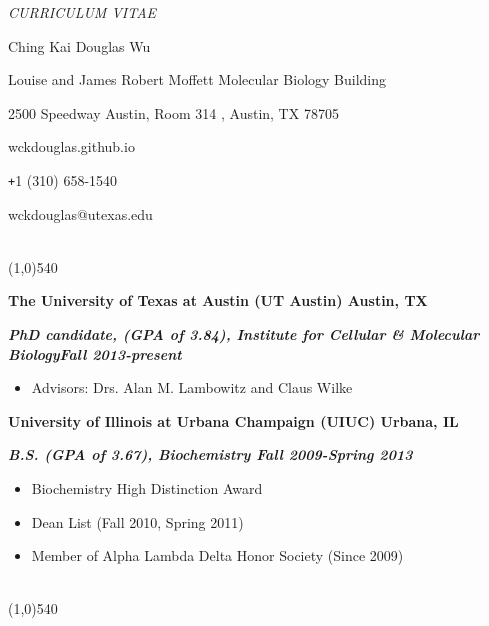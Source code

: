 \documentclass[dvips,11pt]{article}
\begin{document}
\centerline{\it \small CURRICULUM VITAE}
\vspace{2mm}
\centerline{\Large Ching Kai Douglas Wu}
\centerline{ Louise and James Robert Moffett Molecular Biology Building}
\centerline{2500 Speedway Austin, Room 314 , Austin, TX 78705}
\centerline{wckdouglas.github.io}
\centerline{\texttt{+}1 (310) 658-1540}
\centerline{wckdouglas@utexas.edu}
\vspace{.5mm}

 \vspace{-2.5mm}
\\\noindent \line(1,0){540}\\
\noindent \centerline{\bf The University of Texas at Austin (UT Austin) \hfill Austin, TX}
\noindent \centerline{\textit{\textbf{PhD candidate, (GPA of 3.84), Institute for Cellular \& Molecular Biology\hfill Fall 2013-present}}}
\vspace{-6mm}
\begin{spacing}{0.1}
\begin{itemize} \parskip 0pt \parsep 0pt
	\setlength{\itemsep}{1pt}
	\item Advisors: Drs. Alan M. Lambowitz and Claus Wilke
	\end{itemize}
\end{spacing}
\vspace{4mm}
\noindent \centerline{\bf University of Illinois at Urbana Champaign (UIUC) \hfill Urbana, IL}
\noindent \centerline{{\textit{\textbf{B.S. (GPA of 3.67), Biochemistry \hfill Fall 2009-Spring 2013}}}}
\begin{spacing}{0.1}
\vspace{-2.5mm}
\begin{itemize} \itemsep 1pt \parskip 0pt \parsep 0pt
	\setlength{\itemsep}{0pt}
	\item Biochemistry High Distinction Award
	\item Dean List (Fall 2010, Spring 2011)
	\item Member of Alpha Lambda Delta Honor Society (Since 2009)
	\end{itemize}
\end{spacing}
\vspace{+4mm}

 \vspace{-2mm}
\\\noindent \line(1,0){540}\\
\vspace{-5mm}
\end{document}
